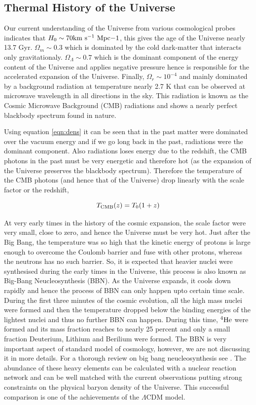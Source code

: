 \subsection{Thermal History of the Universe}

Our current understanding of the Universe from various cosmological probes 
indicates that $H_0\sim 70 \rm{km\ s^{-1}\ Mpc{-1}}$, this gives the
age of the Universe nearly 13.7 Gyr.  $\Omega_m \sim 0.3$ which is dominated
by the cold dark-matter that interacts only gravitationaly.
$\Omega_{\Lambda} \sim 0.7$ which is the dominant component of the energy
content of the Universe and applies negative pressure hence is responsible
for the accelerated expansion of the Universe. Finally, $\Omega_r \sim 10^{-4}$
and mainly dominated by a background radiation at temperature nearly 2.7 K that
can be observed at microwave wavelength in all directions in the sky. This radiation is
known as the Cosmic Microwave Background (CMB) radiations and shows a nearly
perfect blackbody spectrum found in nature.

Using equation \ref{eqn:dens}
it can be seen that in the past matter were dominated over the vacuum 
energy and if we go long back in the past, radiations were the dominant 
component. Also  radiations loses energy due 
to the redshift, the CMB photons in the past must be very energetic and
therefore hot (as the expansion of the Universe preserves the blackbody 
spectrum). Therefore the temperature of the CMB photons (and hence that 
of the Universe) drop linearly with the scale factor or the redshift,

\begin{equation}
	T_{\rm CMB}(z) = T_0(1+z)
\end{equation}

At  very early times in the history of the cosmic expansion, the scale factor 
were very small, close to zero, and hence the Universe must be very hot. Just
after the Big Bang, the temperature was so high that the kinetic energy
of protons is large enough to overcome the Coulomb barrier and fuse with other
protons, whereas the neutrons has no such barrier. So, it is expected that
heavier nuclei were synthesised during the early times in the Universe, this
process is also known as Big-Bang Neucleosynthesis (BBN). As the Universe expands, 
it cools down rapidly and hence the process of BBN can only
happen upto certain time scale. During the first three minutes of the cosmic
evolution, all the high mass nuclei were formed and then the temperature
dropped below the binding energies of the lightest nuclei and thus no
further BBN can happen. During this time, $^4{\rm He}$ were formed and 
its mass fraction reaches to nearly 25 percent and only a small fraction 
Deuterium, Lithium and Berilium were formed. 
The BBN is very important
aspect of standard model of cosmology, however, we are not discussing it in more
details. For a thorough review on big bang 
neucleosynthesis see \cite{}. The abundance of these heavy elements 
can be calculated with a nuclear reaction network and can be well matched
with the current observations putting strong constraints on the physical
baryon density of the Universe. This successful comparison is one of the
achievements of the $\Lambda$CDM model.

